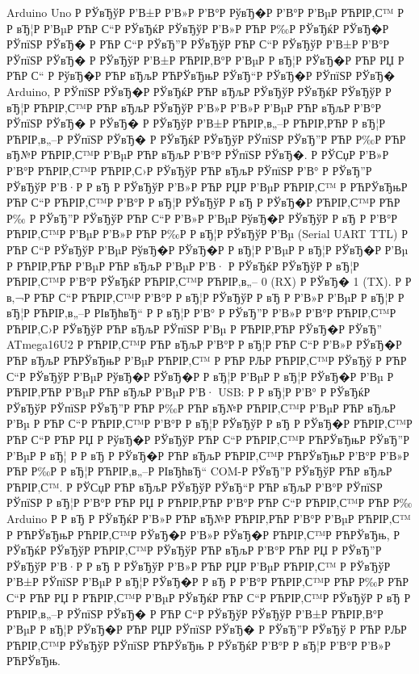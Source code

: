 \documentclass[a4paper,14pt]{extarticle}
\begin{document}
Arduino Uno Р  РЎвЂўР  Р’В±Р  Р’В»Р  Р’В°Р  РўвЂ�Р  Р’В°Р  Р’ВµР РЋРІР‚С™ Р  Р вЂ¦Р  Р’ВµР РЋР С“Р  РЎвЂќР  РЎвЂўР  Р’В»Р РЋР Р‰Р  РЎвЂќР  РЎвЂ�Р  РЎпїЅР  РЎвЂ� Р РЋР С“Р  РЎвЂ”Р  РЎвЂўР РЋР С“Р  РЎвЂўР  Р’В±Р  Р’В°Р  РЎпїЅР  РЎвЂ� Р  РЎвЂўР  Р’В±Р РЋРІР‚В°Р  Р’ВµР  Р вЂ¦Р  РЎвЂ�Р РЋР РЏ Р РЋР С“ Р  РўвЂ�Р РЋР вЂљР РЋРЎвЂњР  РЎвЂ“Р  РЎвЂ�Р  РЎпїЅР  РЎвЂ� Arduino, Р  РЎпїЅР  РЎвЂ�Р  РЎвЂќР РЋР вЂљР  РЎвЂўР  РЎвЂќР  РЎвЂўР  Р вЂ¦Р РЋРІР‚С™Р РЋР вЂљР  РЎвЂўР  Р’В»Р  Р’В»Р  Р’ВµР РЋР вЂљР  Р’В°Р  РЎпїЅР  РЎвЂ� Р  РЎвЂ� Р  РЎвЂўР  Р’В±Р РЋРІР‚в„–Р РЋРІР‚РЋР  Р вЂ¦Р РЋРІР‚в„–Р  РЎпїЅР  РЎвЂ� Р  РЎвЂќР  РЎвЂўР  РЎпїЅР  РЎвЂ”Р РЋР Р‰Р РЋР вЂ№Р РЋРІР‚С™Р  Р’ВµР РЋР вЂљР  Р’В°Р  РЎпїЅР  РЎвЂ�. Р  РЎСџР  Р’В»Р  Р’В°Р РЋРІР‚С™Р РЋРІР‚С›Р  РЎвЂўР РЋР вЂљР  РЎпїЅР  Р’В° Р  РЎвЂ”Р  РЎвЂўР  Р’В·Р  Р вЂ Р  РЎвЂўР  Р’В»Р РЋР РЏР  Р’ВµР РЋРІР‚С™ Р РЋРЎвЂњР РЋР С“Р РЋРІР‚С™Р  Р’В°Р  Р вЂ¦Р  РЎвЂўР  Р вЂ Р  РЎвЂ�Р РЋРІР‚С™Р РЋР Р‰ Р  РЎвЂ”Р  РЎвЂўР РЋР С“Р  Р’В»Р  Р’ВµР  РўвЂ�Р  РЎвЂўР  Р вЂ Р  Р’В°Р РЋРІР‚С™Р  Р’ВµР  Р’В»Р РЋР Р‰Р  Р вЂ¦Р  РЎвЂўР  Р’Вµ (Serial UART TTL) Р РЋР С“Р  РЎвЂўР  Р’ВµР  РўвЂ�Р  РЎвЂ�Р  Р вЂ¦Р  Р’ВµР  Р вЂ¦Р  РЎвЂ�Р  Р’Вµ Р РЋРІР‚РЋР  Р’ВµР РЋР вЂљР  Р’ВµР  Р’В· Р  РЎвЂќР  РЎвЂўР  Р вЂ¦Р РЋРІР‚С™Р  Р’В°Р  РЎвЂќР РЋРІР‚С™Р РЋРІР‚в„– 0 (RX) Р  РЎвЂ� 1 (TX). Р  Р в‚¬Р РЋР С“Р РЋРІР‚С™Р  Р’В°Р  Р вЂ¦Р  РЎвЂўР  Р вЂ Р  Р’В»Р  Р’ВµР  Р вЂ¦Р  Р вЂ¦Р РЋРІР‚в„–Р  РІвЂћвЂ“ Р  Р вЂ¦Р  Р’В° Р  РЎвЂ”Р  Р’В»Р  Р’В°Р РЋРІР‚С™Р РЋРІР‚С›Р  РЎвЂўР РЋР вЂљР  РЎпїЅР  Р’Вµ Р РЋРІР‚РЋР  РЎвЂ�Р  РЎвЂ” ATmega16U2 Р РЋРІР‚С™Р РЋР вЂљР  Р’В°Р  Р вЂ¦Р РЋР С“Р  Р’В»Р  РЎвЂ�Р РЋР вЂљР РЋРЎвЂњР  Р’ВµР РЋРІР‚С™ Р РЋР РЉР РЋРІР‚С™Р  РЎвЂў Р РЋР С“Р  РЎвЂўР  Р’ВµР  РўвЂ�Р  РЎвЂ�Р  Р вЂ¦Р  Р’ВµР  Р вЂ¦Р  РЎвЂ�Р  Р’Вµ Р РЋРІР‚РЋР  Р’ВµР РЋР вЂљР  Р’ВµР  Р’В· USB: Р  Р вЂ¦Р  Р’В° Р  РЎвЂќР  РЎвЂўР  РЎпїЅР  РЎвЂ”Р РЋР Р‰Р РЋР вЂ№Р РЋРІР‚С™Р  Р’ВµР РЋР вЂљР  Р’Вµ Р РЋР С“Р РЋРІР‚С™Р  Р’В°Р  Р вЂ¦Р  РЎвЂўР  Р вЂ Р  РЎвЂ�Р РЋРІР‚С™Р РЋР С“Р РЋР РЏ Р  РўвЂ�Р  РЎвЂўР РЋР С“Р РЋРІР‚С™Р РЋРЎвЂњР  РЎвЂ”Р  Р’ВµР  Р вЂ¦ Р  Р вЂ Р  РЎвЂ�Р РЋР вЂљР РЋРІР‚С™Р РЋРЎвЂњР  Р’В°Р  Р’В»Р РЋР Р‰Р  Р вЂ¦Р РЋРІР‚в„–Р  РІвЂћвЂ“ COM-Р  РЎвЂ”Р  РЎвЂўР РЋР вЂљР РЋРІР‚С™. Р  РЎСџР РЋР вЂљР  РЎвЂўР  РЎвЂ“Р РЋР вЂљР  Р’В°Р  РЎпїЅР  РЎпїЅР  Р вЂ¦Р  Р’В°Р РЋР РЏ Р РЋРІР‚РЋР  Р’В°Р РЋР С“Р РЋРІР‚С™Р РЋР Р‰ Arduino Р  Р вЂ Р  РЎвЂќР  Р’В»Р РЋР вЂ№Р РЋРІР‚РЋР  Р’В°Р  Р’ВµР РЋРІР‚С™ Р РЋРЎвЂњР РЋРІР‚С™Р  РЎвЂ�Р  Р’В»Р  РЎвЂ�Р РЋРІР‚С™Р РЋРЎвЂњ, Р  РЎвЂќР  РЎвЂўР РЋРІР‚С™Р  РЎвЂўР РЋР вЂљР  Р’В°Р РЋР РЏ Р  РЎвЂ”Р  РЎвЂўР  Р’В·Р  Р вЂ Р  РЎвЂўР  Р’В»Р РЋР РЏР  Р’ВµР РЋРІР‚С™ Р  РЎвЂўР  Р’В±Р  РЎпїЅР  Р’ВµР  Р вЂ¦Р  РЎвЂ�Р  Р вЂ Р  Р’В°Р РЋРІР‚С™Р РЋР Р‰Р РЋР С“Р РЋР РЏ Р РЋРІР‚С™Р  Р’ВµР  РЎвЂќР РЋР С“Р РЋРІР‚С™Р  РЎвЂўР  Р вЂ Р РЋРІР‚в„–Р  РЎпїЅР  РЎвЂ� Р РЋР С“Р  РЎвЂўР  РЎвЂўР  Р’В±Р РЋРІР‚В°Р  Р’ВµР  Р вЂ¦Р  РЎвЂ�Р РЋР РЏР  РЎпїЅР  РЎвЂ� Р  РЎвЂ”Р  РЎвЂў Р РЋР РЉР РЋРІР‚С™Р  РЎвЂўР  РЎпїЅР РЋРЎвЂњ Р  РЎвЂќР  Р’В°Р  Р вЂ¦Р  Р’В°Р  Р’В»Р РЋРЎвЂњ.
\end{document}
